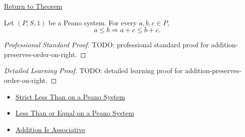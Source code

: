 \newpage
{}
\label{prf:addition-preserves-order-on-right}

\begin{remark*}[Return]
\hyperref[thm:addition-preserves-order-on-right]{Return to Theorem}
\end{remark*}

\begin{theorem*}
Let $(P,S,1)$ be a Peano system. For every $a,b,c \in P$,
\[
a \le b
\Longrightarrow
a+c \le b+c.
\]
\end{theorem*}

\begin{proof}[Professional Standard Proof]
\LRAProofBodyStart
TODO: professional standard proof for addition-preserves-order-on-right.
\end{proof}

\begin{proof}[Detailed Learning Proof]
\LRAProofBodyStart
TODO: detailed learning proof for addition-preserves-order-on-right.
\end{proof}

\begin{remark*}
\end{remark*}

\begin{dependencies}
\begin{itemize}
  \item \hyperref[def:strict-less-than-on-peano-system]{Strict Less Than on a Peano System}
  \item \hyperref[def:less-than-or-equal-on-peano-system]{Less Than or Equal on a Peano System}
  \item \hyperref[thm:addition-associative]{Addition Is Associative}
\end{itemize}
\end{dependencies}

\clearpage
